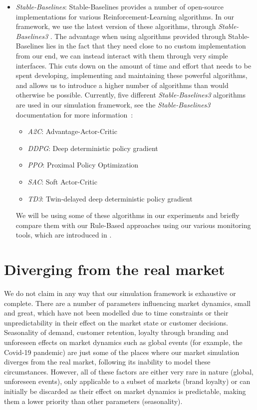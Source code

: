 \begin{itemize}
	\item {}\emph{Stable-Baselines}:\label{item:StableBaselines} Stable-Baselines provides a number of open-source implementations for various Reinforcement-Learning algorithms. In our framework, we use the latest version of these algorithms, through \emph{Stable-Baselines3} \cite{StableBaselines3}. The advantage when using algorithms provided through Stable-Baselines lies in the fact that they need close to no custom implementation from our end, we can instead interact with them through very simple interfaces. This cuts down on the amount of time and effort that needs to be spent developing, implementing and maintaining these powerful algorithms, and allows us to introduce a higher number of algorithms than would otherwise be possible. Currently, five different \emph{Stable-Baselines3} algorithms are used in our simulation framework, see the \emph{Stable-Baselines3} documentation for more information~\cite{StableBaselines3Algorithms}:
	      \begin{itemize}
		      \item \emph{A2C}: Advantage-Actor-Critic
		      \item \emph{DDPG}: Deep deterministic policy gradient
		      \item \emph{PPO}: Proximal Policy Optimization
		      \item \emph{SAC}: Soft Actor-Critic
		      \item \emph{TD3}: Twin-delayed deep deterministic policy gradient
	      \end{itemize}
	      We will be using some of these algorithms in our experiments and briefly compare them with our Rule-Based approaches using our various monitoring tools, which are introduced in .
\end{itemize}

\section{Diverging from the real market}\label{sec:DivergingFromRealMarket}

We do not claim in any way that our simulation framework is exhaustive or complete. There are a number of parameters influencing market dynamics, small and great, which have not been modelled due to time constraints or their unpredictability in their effect on the market state or customer decisions. Seasonality of demand, customer retention, loyalty through branding and unforeseen effects on market dynamics such as global events (for example, the Covid-19 pandemic) are just some of the places where our market simulation diverges from the real market, following its inability to model these circumstances. However, all of these factors are either very rare in nature (global, unforeseen events), only applicable to a subset of markets (brand loyalty) or can initially be discarded as their effect on market dynamics is predictable, making them a lower priority than other parameters (seasonality).


